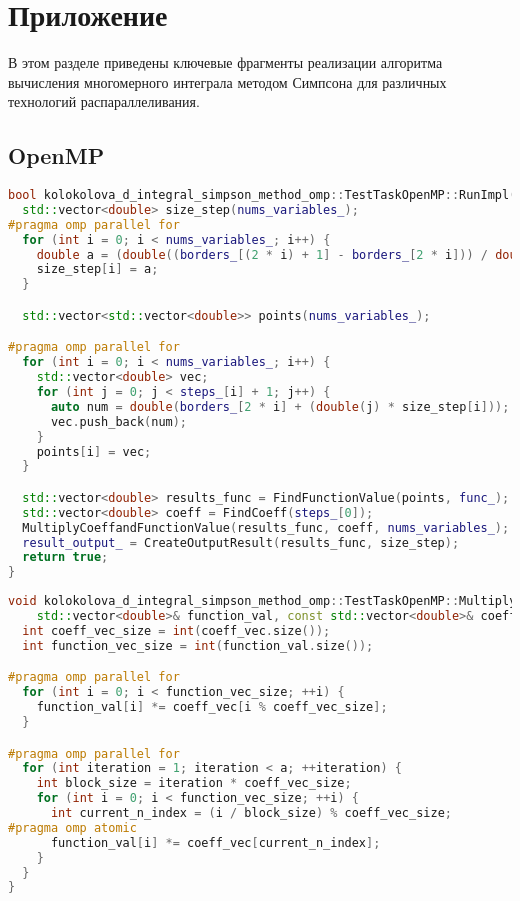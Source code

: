 \documentclass[12pt]{article}
\begin{document}
\section*{Приложение}

В этом разделе приведены ключевые фрагменты реализации алгоритма вычисления многомерного интеграла методом Симпсона для различных технологий распараллеливания.

\subsection*{OpenMP}
\begin{lstlisting}[language=C++]
bool kolokolova_d_integral_simpson_method_omp::TestTaskOpenMP::RunImpl() {
  std::vector<double> size_step(nums_variables_);
#pragma omp parallel for
  for (int i = 0; i < nums_variables_; i++) {
    double a = (double((borders_[(2 * i) + 1] - borders_[2 * i])) / double(steps_[i]));
    size_step[i] = a;
  }

  std::vector<std::vector<double>> points(nums_variables_);

#pragma omp parallel for
  for (int i = 0; i < nums_variables_; i++) {
    std::vector<double> vec;
    for (int j = 0; j < steps_[i] + 1; j++) {
      auto num = double(borders_[2 * i] + (double(j) * size_step[i]));
      vec.push_back(num);
    }
    points[i] = vec;
  }

  std::vector<double> results_func = FindFunctionValue(points, func_);
  std::vector<double> coeff = FindCoeff(steps_[0]);
  MultiplyCoeffandFunctionValue(results_func, coeff, nums_variables_);
  result_output_ = CreateOutputResult(results_func, size_step);
  return true;
}
\end{lstlisting}
\newpage
\begin{lstlisting}[language=C++]
void kolokolova_d_integral_simpson_method_omp::TestTaskOpenMP::MultiplyCoeffandFunctionValue(
    std::vector<double>& function_val, const std::vector<double>& coeff_vec, int a) {
  int coeff_vec_size = int(coeff_vec.size());
  int function_vec_size = int(function_val.size());

#pragma omp parallel for
  for (int i = 0; i < function_vec_size; ++i) {
    function_val[i] *= coeff_vec[i % coeff_vec_size];
  }

#pragma omp parallel for
  for (int iteration = 1; iteration < a; ++iteration) {
    int block_size = iteration * coeff_vec_size;
    for (int i = 0; i < function_vec_size; ++i) {
      int current_n_index = (i / block_size) % coeff_vec_size;
#pragma omp atomic
      function_val[i] *= coeff_vec[current_n_index];
    }
  }
}
\end{lstlisting}
\end{document}
